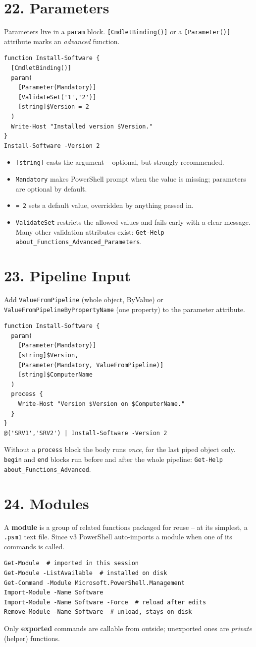 \section{22. Parameters}
Parameters live in a \texttt{param} block. \texttt{[CmdletBinding()]} or a \texttt{[Parameter()]} attribute marks an \emph{advanced} function.
\begin{verbatim}
function Install-Software {
  [CmdletBinding()]
  param(
    [Parameter(Mandatory)]
    [ValidateSet('1','2')]
    [string]$Version = 2
  )
  Write-Host "Installed version $Version."
}
Install-Software -Version 2
\end{verbatim}
\begin{itemize}
\item \texttt{[string]} casts the argument -- optional, but strongly recommended.
\item \texttt{Mandatory} makes PowerShell prompt when the value is missing; parameters are optional by default.
\item \texttt{= 2} sets a default value, overridden by anything passed in.
\item \texttt{ValidateSet} restricts the allowed values and fails early with a clear message. Many other validation attributes exist: \texttt{Get-Help about\_Functions\_Advanced\_Parameters}.
\end{itemize}

\section{23. Pipeline Input}
Add \texttt{ValueFromPipeline} (whole object, ByValue) or \texttt{ValueFromPipelineByPropertyName} (one property) to the parameter attribute.
\begin{verbatim}
function Install-Software {
  param(
    [Parameter(Mandatory)]
    [string]$Version,
    [Parameter(Mandatory, ValueFromPipeline)]
    [string]$ComputerName
  )
  process {
    Write-Host "Version $Version on $ComputerName."
  }
}
@('SRV1','SRV2') | Install-Software -Version 2
\end{verbatim}
Without a \texttt{process} block the body runs \emph{once}, for the last piped object only. \texttt{begin} and \texttt{end} blocks run before and after the whole pipeline: \texttt{Get-Help about\_Functions\_Advanced}.

\section{24. Modules}
A \textbf{module} is a group of related functions packaged for reuse -- at its simplest, a \texttt{.psm1} text file. Since v3 PowerShell auto-imports a module when one of its commands is called.
\begin{verbatim}
Get-Module  # imported in this session
Get-Module -ListAvailable  # installed on disk
Get-Command -Module Microsoft.PowerShell.Management
Import-Module -Name Software
Import-Module -Name Software -Force  # reload after edits
Remove-Module -Name Software  # unload, stays on disk
\end{verbatim}
Only \textbf{exported} commands are callable from outside; unexported ones are \emph{private} (helper) functions.

